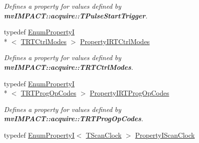 \begin{DoxyCompactItemize}
\begin{DoxyCompactList}\small\item\em Defines a property for values defined by {\bfseries mv\+I\+M\+P\+A\+C\+T\+::acquire\+::\+T\+Pulse\+Start\+Trigger}. \end{DoxyCompactList}\item 
\hypertarget{group___device_specific_interface_gae76ca31bc5381777584ad1431182d5d4}{typedef \hyperlink{classmv_i_m_p_a_c_t_1_1acquire_1_1_enum_property_i}{Enum\+Property\+I}\\*
$<$ \hyperlink{group___device_specific_interface_gaa8cbd8960bf75617dcd943de055a7a14}{T\+R\+T\+Ctrl\+Modes} $>$ \hyperlink{group___device_specific_interface_gae76ca31bc5381777584ad1431182d5d4}{Property\+I\+R\+T\+Ctrl\+Modes}}\label{group___device_specific_interface_gae76ca31bc5381777584ad1431182d5d4}

\begin{DoxyCompactList}\small\item\em Defines a property for values defined by {\bfseries mv\+I\+M\+P\+A\+C\+T\+::acquire\+::\+T\+R\+T\+Ctrl\+Modes}. \end{DoxyCompactList}\item 
\hypertarget{group___device_specific_interface_gaa22518faa79c768c8c1cbf763bc0dec7}{typedef \hyperlink{classmv_i_m_p_a_c_t_1_1acquire_1_1_enum_property_i}{Enum\+Property\+I}\\*
$<$ \hyperlink{group___device_specific_interface_ga5033b37abac54ed7ef556cf2ad7b1152}{T\+R\+T\+Prog\+Op\+Codes} $>$ \hyperlink{group___device_specific_interface_gaa22518faa79c768c8c1cbf763bc0dec7}{Property\+I\+R\+T\+Prog\+Op\+Codes}}\label{group___device_specific_interface_gaa22518faa79c768c8c1cbf763bc0dec7}

\begin{DoxyCompactList}\small\item\em Defines a property for values defined by {\bfseries mv\+I\+M\+P\+A\+C\+T\+::acquire\+::\+T\+R\+T\+Prog\+Op\+Codes}. \end{DoxyCompactList}\item 
\hypertarget{group___device_specific_interface_ga873cba8b9f282d5d983d2be1c8d3dcaa}{typedef \hyperlink{classmv_i_m_p_a_c_t_1_1acquire_1_1_enum_property_i}{Enum\+Property\+I}$<$ \hyperlink{group___device_specific_interface_gaeb51ae9af79746e86fa53a85691fd043}{T\+Scan\+Clock} $>$ \hyperlink{group___device_specific_interface_ga873cba8b9f282d5d983d2be1c8d3dcaa}{Property\+I\+Scan\+Clock}}\label{group___device_specific_interface_ga873cba8b9f282d5d983d2be1c8d3dcaa}


\end{DoxyCompactItemize}
